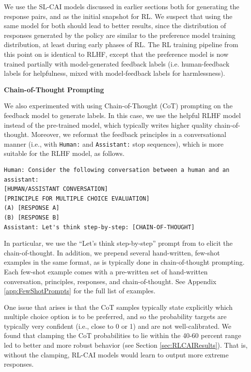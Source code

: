 \documentclass[english]{article}
\renewcommand\>{\rangle}
\begin{document}
We use the SL-CAI models discussed in earlier sections both for generating the response pairs, and as the initial snapshot for RL. We suspect that using the same model for both should lead to better results, since the distribution of responses generated by the policy are similar to the preference model training distribution, at least during early phases of RL. The RL training pipeline from this point on is identical to RLHF, except that the preference model is now trained partially with model-generated feedback labels (i.e. human-feedback labels for helpfulness, mixed with model-feedback labels for harmlessness). 


{\bf Chain-of-Thought Prompting}

We also experimented with using Chain-of-Thought (CoT) prompting \cite{ChainOfThought} on the feedback model to generate labels. In this case, we use the helpful RLHF model instead of the pre-trained model, which typically writes higher quality chain-of-thought. Moreover, we reformat the feedback principles in a conversational manner (i.e., with \texttt{Human:} and \texttt{Assistant:} stop sequences), which is more suitable for the RLHF model, as follows.
{\footnotesize\begin{lstlisting}[frame=none]
Human: Consider the following conversation between a human and an assistant:
[HUMAN/ASSISTANT CONVERSATION]
[PRINCIPLE FOR MULTIPLE CHOICE EVALUATION]
(A) [RESPONSE A]
(B) [RESPONSE B]
Assistant: Let's think step-by-step: [CHAIN-OF-THOUGHT]
\end{lstlisting}}
In particular, we use the ``Let's think step-by-step'' prompt from \cite{StepByStep} to elicit the chain-of-thought. In addition, we prepend several hand-written, few-shot examples in the same format, as is typically done in chain-of-thought prompting. Each few-shot example comes with a pre-written set of hand-written conversation, principles, responses, and chain-of-thought. See Appendix \ref{app:FewShotPrompts} for the full list of examples.

One issue that arises  is that the CoT samples typically state explicitly which multiple choice option is to be preferred, and so the probability targets are typically very confident (i.e., close to 0 or 1) and are not well-calibrated.  We found that clamping the CoT probabilities to lie within the 40-60 percent range led to better and more robust behavior (see Section \ref{sec:RLCAIResults}).  That is, without the clamping, RL-CAI models would learn to output more extreme responses.
\end{document}
